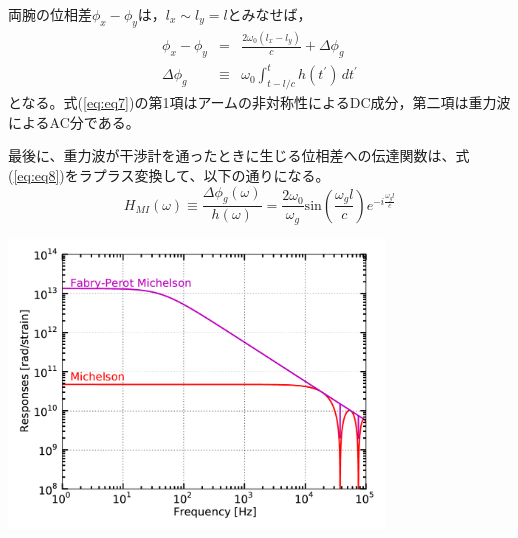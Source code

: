両腕の位相差$\phi_{x}-\phi_{y}$は，$l_x\sim l_y=l$とみなせば，
\begin{eqnarray}\label{eq:eq7}
  \phi_{{x}}-\phi_{{y}} &=& \frac{2\omega_{0}(l_{x}-l_{y})}{c} + \Delta{\phi_{g}} \\ \label{eq:eq7}
  \Delta{\phi_{g}} &\equiv& \omega_{0}\int_{t-l/c}^{t} h(t^{\prime})\, dt^{\prime} \label{eq:eq8}
\end{eqnarray}
となる。式(\ref{eq:eq7})の第1項はアームの非対称性によるDC成分，第二項は重力波によるAC分である。


最後に、重力波が干渉計を通ったときに生じる位相差への伝達関数は、式(\ref{eq:eq8})をラプラス変換して、以下の通りになる。
\begin{equation}\label{eq:eq8_}
  \boxed{H_{MI}(\omega) \equiv \frac{\Delta{\phi_{g}(\omega)}}{h(\omega)} = \frac{2\omega_{0}}{\omega_{g}}\mathrm{sin}(\frac{\omega_{g}{l}}{c})e^{-i\frac{\omega_{g}{l}}{c}} }
\end{equation}

\begin{center}\label{img:img1}
\includegraphics[width=10cm]{./ifo/response_mi-fpmi.png}
\end{center}


